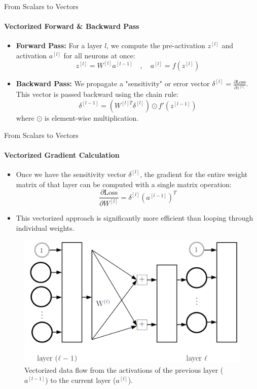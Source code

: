 \begin{frame}{From Scalars to Vectors}
    \framesubtitle{Vectorized Forward \& Backward Pass}
    \begin{itemize}
        \item \textbf{Forward Pass:} For a layer $l$, we compute the pre-activation $z^{[l]}$ and activation $a^{[l]}$ for all neurons at once:
        \[ z^{[l]} = W^{[l]}a^{[l-1]} \quad , \quad a^{[l]} = f(z^{[l]}) \]
        \item \textbf{Backward Pass:} We propagate a "sensitivity" or error vector $\delta^{[l]} = \frac{\partial \text{Loss}}{\partial z^{[l]}}$. This vector is passed backward using the chain rule:
        \[ \delta^{[l-1]} = (W^{[l]T}\delta^{[l]}) \odot f'(z^{[l-1]}) \]
        where $\odot$ is element-wise multiplication.
    \end{itemize}
\end{frame}

\begin{frame}{From Scalars to Vectors}
    \framesubtitle{Vectorized Gradient Calculation}
    \begin{itemize}
        \item Once we have the sensitivity vector $\delta^{[l]}$, the gradient for the entire weight matrix of that layer can be computed with a single matrix operation:
        \[ \frac{\partial \text{Loss}}{\partial W^{[l]}} = \delta^{[l]}(a^{[l-1]})^{T} \]
        \item This vectorized approach is significantly more efficient than looping through individual weights.
    \end{itemize}
    \begin{figure}
        \centering
        \includegraphics[width=0.8\linewidth]{images/vectorized_backprop.png}
        \caption{Vectorized data flow from the activations of the previous layer ($a^{[l-1]}$) to the current layer ($a^{[l]}$).}
    \end{figure}
\end{frame}